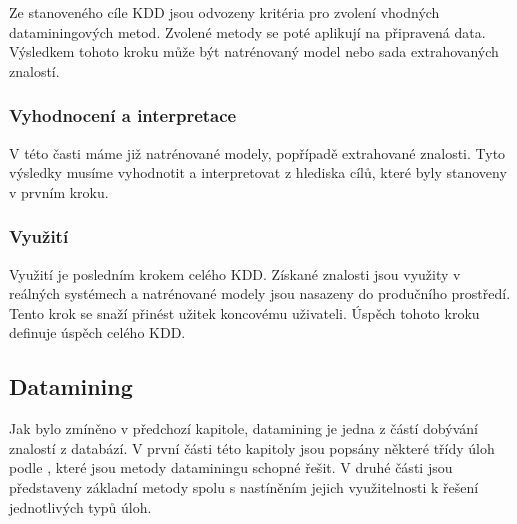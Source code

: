 \documentclass[thesis=M,czech]{FITthesis}[2012/06/26]
\begin{document}
Ze stanoveného cíle KDD jsou odvozeny kritéria pro zvolení vhodných dataminingových metod. Zvolené metody se poté aplikují na připravená data. Výsledkem tohoto kroku může být natrénovaný model nebo sada extrahovaných znalostí.

\subsubsection*{Vyhodnocení a interpretace}
V této časti máme již natrénované modely, popřípadě extrahované znalosti. Tyto výsledky musíme vyhodnotit a interpretovat z hlediska cílů, které byly stanoveny v prvním kroku.

\subsubsection*{Využití}
Využití je posledním krokem celého KDD. Získané znalosti jsou využity v reálných systémech a natrénované modely jsou nasazeny do produčního prostředí. Tento krok se snaží přinést užitek koncovému uživateli. Úspěch tohoto kroku definuje úspěch celého KDD.	
	

\subsection{Datamining}
Jak bylo zmíněno v předchozí kapitole, datamining je jedna z částí dobývání znalostí z databází. V první části této kapitoly jsou popsány některé třídy úloh podle \cite{fayyad}, které jsou metody dataminingu schopné řešit. V druhé části jsou představeny základní metody spolu s nastíněním jejich využitelnosti k řešení jednotlivých typů úloh. 
\end{document}
